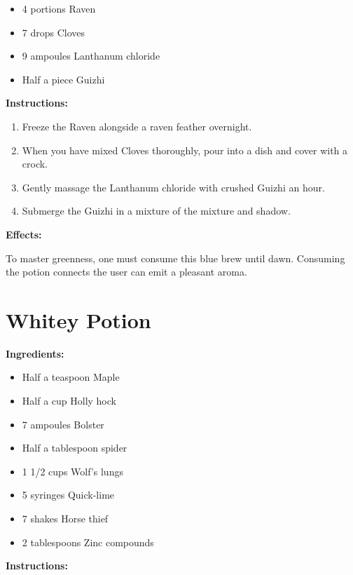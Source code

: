 \documentclass{article}
\begin{document}
\begin{itemize}
  \item 4 portions Raven
  \item 7 drops Cloves
  \item 9 ampoules Lanthanum chloride
  \item Half a piece Guizhi
\end{itemize}

\textbf{Instructions:}

\begin{enumerate}
  \item Freeze the Raven alongside a raven feather overnight.
  \item When you have mixed Cloves thoroughly, pour into a dish and cover with a crock.
  \item Gently massage the Lanthanum chloride with crushed Guizhi an hour.
  \item Submerge the Guizhi in a mixture of the mixture and shadow.
\end{enumerate}

\textbf{Effects:}

To master greenness, one must consume this blue brew until dawn. Consuming the potion connects the user can emit a pleasant aroma.

\newpage
\section*{Whitey Potion}

\textbf{Ingredients:}

\begin{itemize}
  \item Half a teaspoon Maple
  \item Half a cup Holly hock
  \item 7 ampoules Bolster
  \item Half a tablespoon spider
  \item 1 1/2 cups Wolf's lungs
  \item 5 syringes Quick-lime
  \item 7 shakes Horse thief
  \item 2 tablespoons Zinc compounds
\end{itemize}

\textbf{Instructions:}
\end{document}
